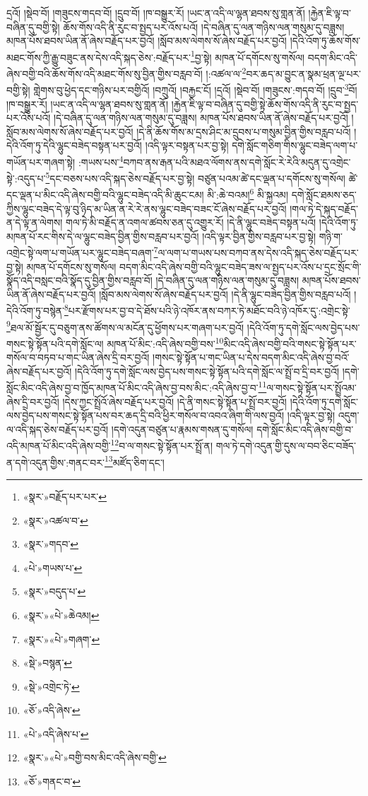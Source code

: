དྲའོ། །སྡེབ་བོ། །གཟུངས་གདབ་བོ། །དྲུབ་བོ། །ཁ་བསྒྱུར་རོ། །ཡང་ན་འདི་ལ་ལྷན་ཐབས་སུ་གླན་ནོ། །རྐྱེན་ཇི་ལྟ་བ་བཞིན་དུ་བགྱི་སྟེ། ཆོས་གོས་འདི་ནི་རུང་བ་སྤྱད་པར་འོས་པའོ། །དེ་བཞིན་དུ་ལན་གཉིས་ལན་གསུམ་དུ་བཟླས། མཁན་པོས་ཐབས་ཡིན་ནོ་ཞེས་བརྗོད་པར་བྱའོ། །སློབ་མས་ལེགས་སོ་ཞེས་བརྗོད་པར་བྱའོ། །དེའི་འོག་ཏུ་ཆོས་གོས་མཐང་གོས་ཀྱི་རྒྱུ་བཟུང་ནས་དེས་འདི་སྐད་ཅེས་:བརྗོད་པར་\footnote{«སྣར་»བརྗོད་པར་པར་}བྱ་སྟེ། མཁན་པོ་དགོངས་སུ་གསོལ། བདག་མིང་འདི་ཞེས་བགྱི་བའི་ཆོས་གོས་འདི་མཐང་གོས་སུ་བྱིན་གྱིས་བརླབ་བོ། །:འཚལ་ལ་\footnote{«སྣར་»འཚལ་བ་}བར་ཆད་མ་བྱུང་ན་སྣམ་ཕྲན་ལྔ་པར་བགྱི་སྟེ། གླེགས་བུ་ཕྱེད་དང་གཉིས་པར་བགྱིའོ། །བཀྲུའོ། །བརྐྱང་ངོ། །དྲའོ། །སྡེབ་བོ། །གཟུངས་:གདབ་བོ། །དྲུབ་\footnote{«སྣར་»གདབ་}བོ། །ཁ་བསྒྱུར་རོ། །ཡང་ན་འདི་ལ་ལྷན་ཐབས་སུ་གླན་ནོ། །རྐྱེན་ཇི་ལྟ་བ་བཞིན་དུ་བགྱི་སྟེ་ཆོས་གོས་འདི་ནི་རུང་བ་སྤྱད་པར་འོས་པའོ། །དེ་བཞིན་དུ་ལན་གཉིས་ལན་གསུམ་དུ་བཟླས། མཁན་པོས་ཐབས་ཡིན་ནོ་ཞེས་བརྗོད་པར་བྱའོ། །སློབ་མས་ལེགས་སོ་ཞེས་བརྗོད་པར་བྱའོ། །དེ་ནི་ཆོས་གོས་མ་དྲས་ཤིང་མ་དྲུབས་པ་གསུམ་བྱིན་གྱིས་བརླབ་པའོ། །དེའི་འོག་ཏུ་དེའི་ལྷུང་བཟེད་བསྟན་པར་བྱའོ། །འདི་ལྟར་བསྟན་པར་བྱ་སྟེ། དགེ་སློང་གཅིག་གིས་ལྷུང་བཟེད་ལག་པ་གཡོན་པར་གཞག་སྟེ། :གཡས་པས་\footnote{«པེ་»གཡས་པ་}བཀབ་ནས་རྒན་པའི་མཐའ་ལོགས་ནས་དགེ་སློང་རེ་རེའི་མདུན་དུ་འགྲེང་སྟེ་:འདུད་པ་\footnote{«སྣར་»བདུད་པ་}དང་བཅས་པས་འདི་སྐད་ཅེས་བརྗོད་པར་བྱ་སྟེ། བཙུན་པའམ་ཚེ་དང་ལྡན་པ་དགོངས་སུ་གསོལ། ཚེ་དང་ལྡན་པ་མིང་འདི་ཞེས་བགྱི་བའི་ལྷུང་བཟེད་འདི་མི་ཆུང་ངམ། མི་:ཆེ་བའམ།\footnote{«སྣར་»«པེ་»ཆེའམ།} མི་སྐྱའམ། དགེ་སློང་ཐམས་ཅད་ཀྱིས་ལྷུང་བཟེད་དེ་ལྟ་བུ་ཉིད་མ་ཡིན་ན་རེ་རེ་ནས་ལྷུང་བཟེད་བཟང་ངོ་ཞེས་བརྗོད་པར་བྱའོ། །གལ་ཏེ་དེ་སྐད་བརྗོད་ན་དེ་ལྟ་ན་ལེགས། གལ་ཏེ་མི་བརྗོད་ན་འགལ་ཚབས་ཅན་དུ་འགྱུར་རོ། །དེ་ནི་ལྷུང་བཟེད་བསྟན་པའོ། །དེའི་འོག་ཏུ་མཁན་པོ་རང་གིས་དེ་ལ་ལྷུང་བཟེད་བྱིན་གྱིས་བརླབ་པར་བྱའོ། །འདི་ལྟར་བྱིན་གྱིས་བརླབ་པར་བྱ་སྟེ། གཉི་ག་འགྲེང་སྟེ་ལག་པ་གཡོན་པར་ལྷུང་བཟེད་བཞག་\footnote{«སྣར་»«པེ་»གཞག་}ལ་ལག་པ་གཡས་པས་བཀབ་ནས་དེས་འདི་སྐད་ཅེས་བརྗོད་པར་བྱ་སྟེ། མཁན་པོ་དགོངས་སུ་གསོལ། བདག་མིང་འདི་ཞེས་བགྱི་བའི་ལྷུང་བཟེད་ཟས་ལ་སྤྱད་པར་འོས་པ་དྲང་སྲོང་གི་སྣོད་འདི་བསླང་བའི་སྣོད་དུ་བྱིན་གྱིས་བརླབ་བོ། །དེ་བཞིན་དུ་ལན་གཉིས་ལན་གསུམ་དུ་བཟླས། མཁན་པོས་ཐབས་ཡིན་ནོ་ཞེས་བརྗོད་པར་བྱའོ། །སློབ་མས་ལེགས་སོ་ཞེས་བརྗོད་པར་བྱའོ། །དེ་ནི་ལྷུང་བཟེད་བྱིན་གྱིས་བརླབ་པའོ། །དེའི་འོག་ཏུ་བསྙེན་\footnote{«སྡེ་»བསྙན་}པར་རྫོགས་པར་བྱ་བ་དེ་ཐོས་པའི་ཉེ་འཁོར་ནས་བཀར་ཏེ་མཐོང་བའི་ཉེ་འཁོར་དུ་:འགྲེང་སྟེ་\footnote{«སྡེ་»འགྲེང་ཏེ་}ཐལ་མོ་སྦྱོར་དུ་བཅུག་ནས་ཚོགས་ལ་མངོན་དུ་ཕྱོགས་པར་གཞག་པར་བྱའོ། །དེའི་འོག་ཏུ་དགེ་སློང་ལས་བྱེད་པས་གསང་སྟེ་སྟོན་པའི་དགེ་སློང་ལ། མཁན་པོ་མིང་:འདི་ཞེས་བགྱི་བས་\footnote{«ཅོ་»འདི་ཞེས་}མིང་འདི་ཞེས་བགྱི་བའི་གསང་སྟེ་སྟོན་པར་གསོལ་བ་བཏབ་པ་གང་ཡིན་ཞེས་དྲི་བར་བྱའོ། །གསང་སྟེ་སྟོན་པ་གང་ཡིན་པ་དེས་བདག་མིང་འདི་ཞེས་བྱ་བའོ་ཞེས་བརྗོད་པར་བྱའོ། །དེའི་འོག་ཏུ་དགེ་སློང་ལས་བྱེད་པས་གསང་སྟེ་སྟོན་པའི་དགེ་སློང་ལ་སྤྲོ་བ་དྲི་བར་བྱའོ། །དགེ་སློང་མིང་འདི་ཞེས་བྱ་བ་ཁྱོད་མཁན་པོ་མིང་འདི་ཞེས་བྱ་བས་མིང་:འདི་ཞེས་བྱ་བ་\footnote{«པེ་»འདི་ཞེས་པ་}ལ་གསང་སྟེ་སྟོན་པར་སྤྲོའམ་ཞེས་དྲི་བར་བྱའོ། །དེས་ཀྱང་སྤྲོའོ་ཞེས་བརྗོད་པར་བྱའོ། །དེ་ནི་གསང་སྟེ་སྟོན་པ་སྤྲོ་བར་བྱའོ། །དེའི་འོག་ཏུ་དགེ་སློང་ལས་བྱེད་པས་གསང་སྟེ་སྟོན་པས་བར་ཆད་དྲི་བའི་ཕྱིར་གསོལ་བ་འབའ་ཞིག་གི་ལས་བྱའོ། །འདི་ལྟར་བྱ་སྟེ། འདུག་ལ་འདི་སྐད་ཅེས་བརྗོད་པར་བྱའོ། །དགེ་འདུན་བཙུན་པ་རྣམས་གསན་དུ་གསོལ། དགེ་སློང་མིང་འདི་ཞེས་བགྱི་བ་འདི་མཁན་པོ་མིང་འདི་ཞེས་བགྱི་\footnote{«སྣར་»«པེ་»བགྱི་བས་མིང་འདི་ཞེས་བགྱི་}བ་ལ་གསང་སྟེ་སྟོན་པར་སྤྲོ་ན། གལ་ཏེ་དགེ་འདུན་གྱི་དུས་ལ་བབ་ཅིང་བཟོད་ན་དགེ་འདུན་གྱིས་:གནང་བར་\footnote{«ཅོ་»གནང་བ་}མཛོད་ཅིག་དང་། 